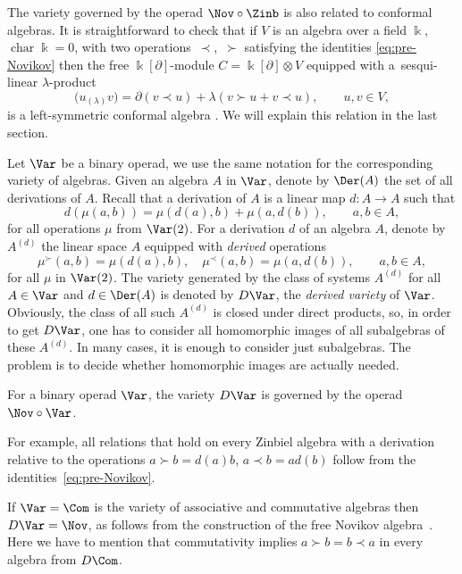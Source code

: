 \begin{Remark}\label{rem:Conformal}
The variety governed by the operad $\Nov\circ \Zinb $
is also related to conformal algebras.
It is straightforward to check that if $V$ is an algebra over a field $\Bbbk $, $\operatorname{char}\Bbbk =0$, with two
operations~$\prec$,~$\succ $ satisfying the identities
\eqref{eq:pre-Novikov}
then the free
$\Bbbk [\partial ]$-module $C=\Bbbk[\partial ]\otimes V$
equipped with a~sesqui-linear $\lambda $-product
\[
\bigl(u{}_{(\lambda )} v\bigr) = \partial (v\prec u) + \lambda (v\succ u + v\prec u),
\qquad u,v\in V,
\]
is a left-symmetric conformal algebra \cite{HongLi2015}.
We will explain this relation in the last section.
\end{Remark}

Let $\Var $ be a binary operad, we use the same notation for the
corresponding variety of algebras.
Given an algebra $A$ in $\Var $, denote by $\Der(A) $
the set of all derivations of $A$. Recall that
a derivation of $A$ is a linear map $d\colon A\to A$
such that
\[
 d(\mu(a,b)) = \mu(d(a),b) + \mu(a,d(b)), \qquad a,b\in A,
\]
for all operations $\mu $ from $\Var (2)$.
For a derivation $d$ of an algebra $A$, denote by
$A^{(d)}$ the linear space $A$ equipped with {\em derived}
operations
%
\begin{equation}\label{eq:Der-op}
 \mu^{\succ }(a,b) = \mu(d(a),b), \quad \mu^{\prec }(a,b) = \mu(a,d(b)), \qquad a,b\in A,
\end{equation}
%
for all $\mu $ in $\Var (2)$.
The variety generated by the class of systems $A^{(d)}$ for all $A\in \Var$ and $d\in \Der(A)$
is denoted by $D\Var$, the {\em derived variety} of $\Var $.
Obviously, the class of all such $A^{(d)}$ is closed under direct products,
so, in order to get $D\Var$, one has to consider all homomorphic images of all subalgebras of these $A^{(d)}$.
In many cases, it is enough to consider just subalgebras.
The problem is to decide whether homomorphic images are actually needed.

\begin{Theorem}
For a binary operad $\Var $, the variety $D\Var $ is governed
by the operad ${\Nov\circ \Var}$.
\end{Theorem}

For example,
all relations that hold
on every Zinbiel algebra with a derivation relative to
the operations $a\succ b = d(a)b$, $a\prec b = ad(b)$
follow from the identities~\eqref{eq:pre-Novikov}.

If $\Var = \Com$ is the variety of associative and commutative algebras
then $D\Var = \Nov$, as follows from the construction of the free Novikov
algebra~\cite{DzhLofwall2002}. Here we have to mention
that commutativity implies $a\succ b = b\prec a$ in every
algebra from $D\Com $.

